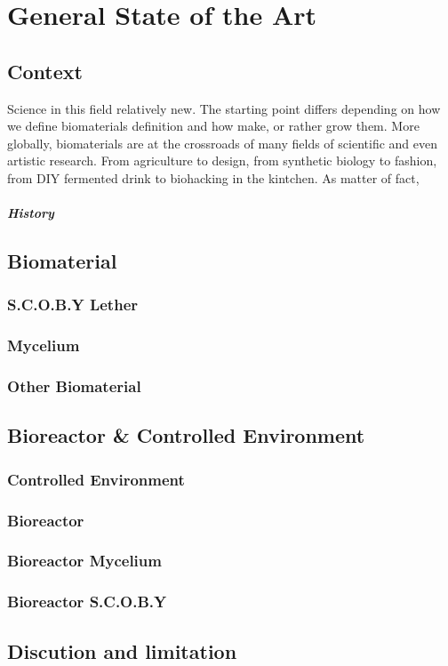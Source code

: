 \chapter{General State of the Art}


\section{Context}
Science in this field relatively new. The starting point differs depending on how we define biomaterials definition and how make, or rather grow them. 
More globally, biomaterials are at the crossroads of many fields of scientific and even artistic research. From agriculture to design, from synthetic biology to fashion, from DIY fermented drink to biohacking in the kintchen.
As matter of fact,   

\paragraph[short]{History} 

\section{Biomaterial}

\subsection{S.C.O.B.Y Lether}
\subsection{Mycelium}
\subsection{Other Biomaterial}

\section{Bioreactor \& Controlled Environment }

\subsection{Controlled Environment}
\subsection{Bioreactor}
\subsection{Bioreactor Mycelium}
\subsection{Bioreactor S.C.O.B.Y}


\section{Discution and limitation}